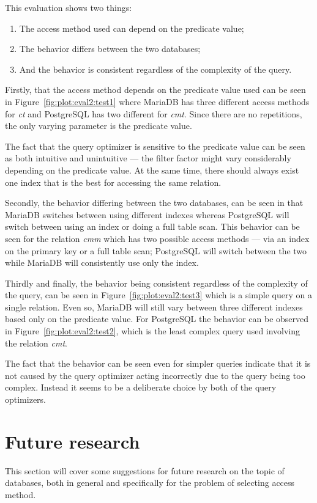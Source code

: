 This evaluation shows two things:
\begin{enumerate}
\item The access method used can depend on the predicate value;
\item The behavior differs between the two databases;
\item And the behavior is consistent regardless of the complexity of the query.
\end{enumerate}

Firstly, that the access method depends on the predicate value used can be seen in
Figure~\ref{fig:plot:eval2:test1} where MariaDB has three different access
methods for \textit{ct} and PostgreSQL has two different for \textit{cmt}. Since
there are no repetitions, the only varying parameter is the predicate value.

The fact that the query optimizer is sensitive to the predicate value can be seen as
both intuitive and unintuitive --- the filter factor might vary considerably
depending on the predicate value. At the same time, there should always exist
one index that is the best for accessing the same relation.

Secondly, the behavior differing between the two databases, can be seen in that
MariaDB switches between using different indexes whereas PostgreSQL will
switch between using an index or doing a full table scan. This behavior can be
seen for the relation \textit{cmm} which has two possible access methods --- via
an index on the primary key or a full table scan; PostgreSQL will switch between
the two while MariaDB will consistently use only the index.

Thirdly and finally, the behavior being consistent regardless of the complexity
of the query, can be seen in Figure~\ref{fig:plot:eval2:test3} which is a simple
query on a single relation. Even so, MariaDB will still vary between three
different indexes based only on the predicate value. For PostgreSQL the behavior
can be observed in Figure~\ref{fig:plot:eval2:test2}, which is the least complex
query used involving the relation \textit{cmt}.

The fact that the behavior can be seen even for simpler queries indicate that it
is not caused by the query optimizer acting incorrectly due to the query being
too complex. Instead it seems to be a deliberate choice by both of the query
optimizers.

\section{Future research}
This section will cover some suggestions for future research on the topic of
databases, both in general and specifically for the problem of selecting access method.

